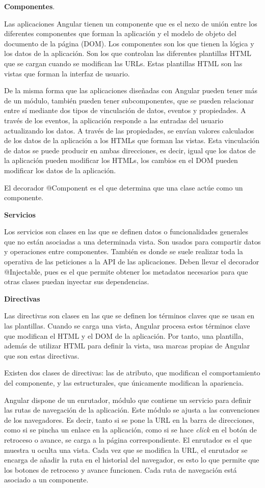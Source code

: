 \documentclass[a4paper, 12pt]{book}
\begin{document}
\textbf{Componentes}. 

Las aplicaciones Angular tienen un componente que es el nexo de unión entre los diferentes componentes que forman la aplicación y el modelo de objeto del documento de la página (DOM). Los componentes son los que tienen la lógica y los datos de la aplicación. Son los que controlan las diferentes plantillas HTML que se cargan cuando se modifican las URLs. Estas plantillas HTML son las vistas que forman la interfaz de usuario.

De la misma forma que las aplicaciones diseñadas con Angular pueden tener más de un módulo, también pueden tener subcomponentes, que se pueden relacionar entre sí mediante dos tipos de vinculación de datos, eventos y propiedades. A través de los eventos, la aplicación responde a las entradas del usuario actualizando los datos. A través de las propiedades, se envían valores calculados de los datos de la aplicación a los HTMLs que forman las vistas. Esta vinculación de datos se puede producir en ambas direcciones, es decir, igual que los datos de la aplicación pueden modificar los HTMLs, los cambios en el DOM pueden modificar los datos de la aplicación.

El decorador @Component es el que determina que una clase actúe como un componente. 

\textbf{Servicios}

Los servicios son clases en las que se definen datos o funcionalidades generales que no están asociadas a una determinada vista. Son usados para compartir datos y operaciones entre componentes. También es donde se suele realizar toda la operativa de las peticiones a la API de las aplicaciones. Deben llevar el decorador @Injectable, pues es el que permite obtener los metadatos necesarios para que otras clases puedan inyectar sus dependencias. 

\textbf{Directivas}

Las directivas son clases en las que se definen los términos claves que se usan en las plantillas. Cuando se carga una vista, Angular procesa estos términos clave que modifican el HTML y el DOM de la aplicación. Por tanto, una plantilla, además de utilizar HTML para definir la vista, usa marcas propias de Angular que son estas directivas. 

Existen dos clases de directivas: las de atributo, que modifican el comportamiento del componente, y las estructurales, que únicamente modifican la apariencia. 

Angular dispone de un enrutador, módulo que contiene un servicio para definir las rutas de navegación de la aplicación. Este módulo se ajusta a las convenciones de los navegadores. Es decir, tanto si se pone la URL en la barra de direcciones, como si se pincha un enlace en la aplicación, como si se hace \emph{click} en el botón de retroceso o avance, se carga a la página correspondiente. El enrutador es el que muestra u oculta una vista. Cada vez que se modifica la URL, el enrutador se encarga de añadir la ruta en el historial del navegador, es esto lo que permite que los botones de retroceso y avance funcionen. Cada ruta de navegación está asociado a un componente. 
\end{document}
